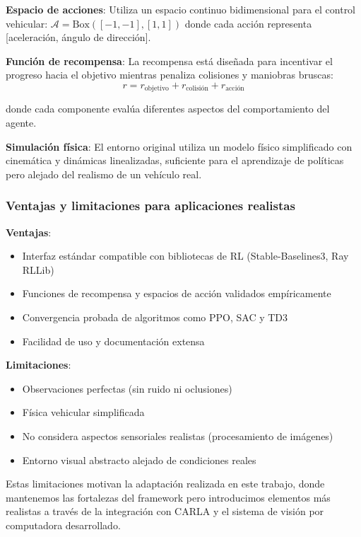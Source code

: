 \noindent
\textbf{Espacio de acciones}: Utiliza un espacio continuo bidimensional para el control
vehicular: $\mathcal{A} = \text{Box}([-1, -1], [1, 1])$ donde cada acción representa
[aceleración, ángulo de dirección].

\noindent
\textbf{Función de recompensa}: La recompensa está diseñada para incentivar el progreso
hacia el objetivo mientras penaliza colisiones y maniobras bruscas:
\begin{equation}
    r = r_{\text{objetivo}} + r_{\text{colisión}} + r_{\text{acción}}
\end{equation}

donde cada componente evalúa diferentes aspectos del comportamiento del agente.

\noindent
\textbf{Simulación física}: El entorno original utiliza un modelo físico simplificado
con cinemática y dinámicas linealizadas, suficiente para el aprendizaje
de políticas pero alejado del realismo de un vehículo real.

\subsubsection{Ventajas y limitaciones para aplicaciones realistas}
\noindent
\textbf{Ventajas}:
\begin{itemize}
    \item Interfaz estándar compatible con bibliotecas de RL (Stable-Baselines3, Ray RLLib)
    \item Funciones de recompensa y espacios de acción validados empíricamente
    \item Convergencia probada de algoritmos como PPO, SAC y TD3
    \item Facilidad de uso y documentación extensa
\end{itemize}

\noindent
\textbf{Limitaciones}:
\begin{itemize}
    \item Observaciones perfectas (sin ruido ni oclusiones)
    \item Física vehicular simplificada
    \item No considera aspectos sensoriales realistas (procesamiento de imágenes)
    \item Entorno visual abstracto alejado de condiciones reales
\end{itemize}

\noindent
Estas limitaciones motivan la adaptación realizada en este trabajo, donde mantenemos
las fortalezas del framework pero introducimos elementos más realistas a través de
la integración con CARLA y el sistema de visión por computadora desarrollado.
